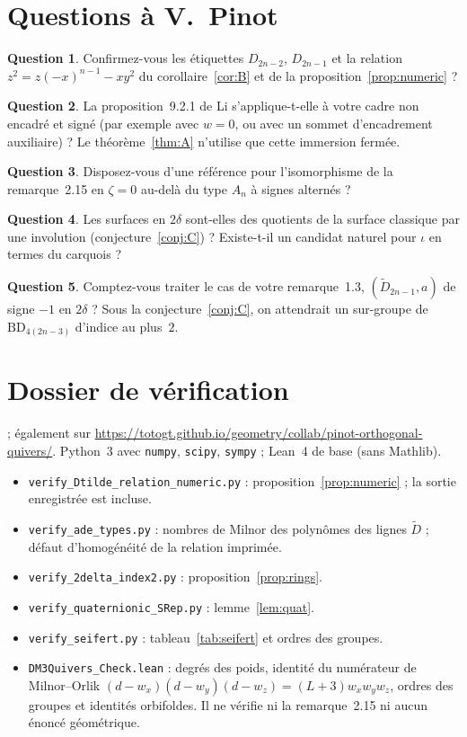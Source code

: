 \documentclass[11pt]{article}
\theoremstyle{definition}
\newtheorem{question}{Question}
\theoremstyle{remark}
\newcommand{\BD}{\mathrm{BD}}
\newcommand{\bundleurl}{https://totogt.github.io/geometry/collab/pinot-orthogonal-quivers/}
\begin{document}
\section{Questions à V.~Pinot}
\begin{question} Confirmez-vous les étiquettes $D_{2n-2}$, $D_{2n-1}$ et la relation $z^2=z(-x)^{n-1}-xy^2$ du corollaire~\ref{cor:B} et de la proposition~\ref{prop:numeric} ?\end{question}
\begin{question}\label{q:li} La proposition~9.2.1 de Li s'applique-t-elle à votre cadre non encadré et signé (par exemple avec $w=0$, ou avec un sommet d'encadrement auxiliaire) ? Le théorème~\ref{thm:A} n'utilise que cette immersion fermée.\end{question}
\begin{question} Disposez-vous d'une référence pour l'isomorphisme de la remarque~2.15 en $\zeta=0$ au-delà du type $A_n$ à signes alternés ?\end{question}
\begin{question} Les surfaces en $2\delta$ sont-elles des quotients de la surface classique par une involution (conjecture~\ref{conj:C}) ? Existe-t-il un candidat naturel pour $\iota$ en termes du carquois ?\end{question}
\begin{question} Comptez-vous traiter le cas de votre remarque~1.3, $(\widetilde D_{2n-1},a)$ de signe $-1$ en $2\delta$ ? Sous la conjecture~\ref{conj:C}, on attendrait un sur-groupe de $\BD_{4(2n-3)}$ d'indice au plus~$2$.\end{question}

\appendix
\section{Dossier de vérification}
 ; également sur \url{\bundleurl}. Python~3 avec \texttt{numpy}, \texttt{scipy}, \texttt{sympy} ; Lean~4 de base (sans Mathlib).
\begin{itemize}[leftmargin=*]
\item \texttt{verify\_Dtilde\_relation\_numeric.py} : proposition~\ref{prop:numeric} ; la sortie enregistrée est incluse.
\item \texttt{verify\_ade\_types.py} : nombres de Milnor des polynômes des lignes $\widetilde D$ ; défaut d'homogénéité de la relation imprimée.
\item \texttt{verify\_2delta\_index2.py} : proposition~\ref{prop:rings}.
\item \texttt{verify\_quaternionic\_SRep.py} : lemme~\ref{lem:quat}.
\item \texttt{verify\_seifert.py} : tableau~\ref{tab:seifert} et ordres des groupes.
\item \texttt{DM3Quivers\_Check.lean} : degrés des poids, identité du numérateur de Milnor--Orlik $(d-w_x)(d-w_y)(d-w_z)=(L+3)w_xw_yw_z$, ordres des groupes et identités orbifoldes. Il ne vérifie ni la remarque~2.15 ni aucun énoncé géométrique.
\end{itemize}
\end{document}
